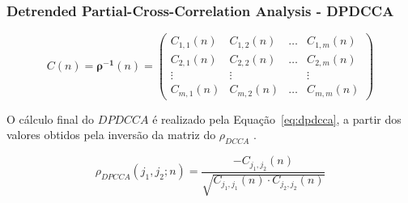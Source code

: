 \documentclass[11pt, aspectratio=169]{beamer}
\newcommand{\pdcca}{\({\rho}_{DCCA}\) }
\begin{document}
\begin{frame}
  \frametitle{Detrended Partial-Cross-Correlation Analysis - DPDCCA}
\begin{equation}\label{eq:dpdcca_mat}
  C(n)=\boldsymbol{\rho}^{-\mathbf{1}}(n)=\left(\begin{matrix}
  C_{1,1}(n) & C_{1,2}(n) & \ldots & 
  C_{1, m}(n) \\
  C_{2,1}(n) & C_{2,2}(n) & \ldots & C_{2, m}(n) \\
  \vdots & \vdots & & \vdots \\
  C_{m, 1}(n) & C_{m, 2}(n) & \ldots & C_{m, m}(n)
  \end{matrix}\right)
\end{equation}

O cálculo final do $DPDCCA$ é realizado pela Equação~\ref{eq:dpdcca}, a partir dos valores obtidos pela inversão da matriz do \pdcca.

\begin{equation}\label{eq:dpdcca}
  \rho_{D P C C A}\left(j_1, j_2 ; n\right)=\frac{-C_{j_1, j_2}(n)}{\sqrt{C_{j_1, j_1}(n) \cdot C_{j_2, j_2}(n)}}
\end{equation}

\cite{yuanDetrendedPartialCrossCorrelationAnalysis2015}
  
\end{frame}
\end{document}
